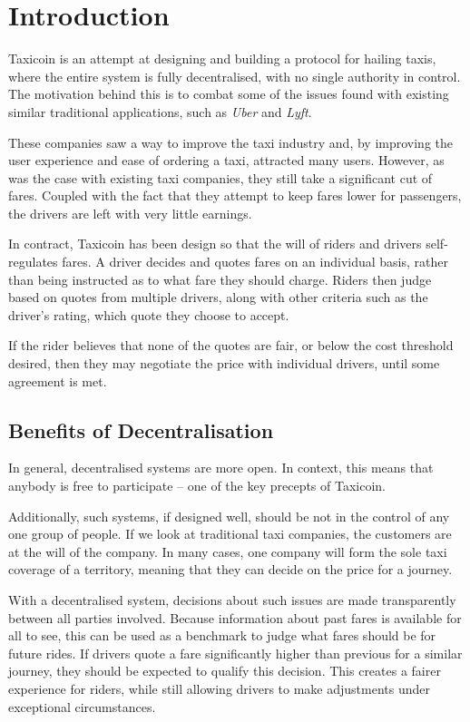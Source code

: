 \section{Introduction}

Taxicoin is an attempt at designing and building a protocol for hailing taxis, where the entire system is fully decentralised, with no single authority in control. The motivation behind this is to combat some of the issues found with existing similar traditional applications, such as \textit{Uber} and \textit{Lyft}.

These companies saw a way to improve the taxi industry and, by improving the user experience and ease of ordering a taxi, attracted many users. However, as was the case with existing taxi companies, they still take a significant cut of fares. Coupled with the fact that they attempt to keep fares lower for passengers, the drivers are left with very little earnings.

In contract, Taxicoin has been design so that the will of riders and drivers self-regulates fares. A driver decides and quotes fares on an individual basis, rather than being instructed as to what fare they should charge. Riders then judge based on quotes from multiple drivers, along with other criteria such as the driver's rating, which quote they choose to accept.

If the rider believes that none of the quotes are fair, or below the cost threshold desired, then they may negotiate the price with individual drivers, until some agreement is met.

\subsection{Benefits of Decentralisation}

In general, decentralised systems are more open. In context, this means that anybody is free to participate -- one of the key precepts of Taxicoin.

Additionally, such systems, if designed well, should be not in the control of any one group of people. If we look at traditional taxi companies, the customers are at the will of the company. In many cases, one company will form the sole taxi coverage of a territory, meaning that they can decide on the price for a journey.

With a decentralised system, decisions about such issues are made transparently between all parties involved. Because information about past fares is available for all to see, this can be used as a benchmark to judge what fares should be for future rides. If drivers quote a fare significantly higher than previous for a similar journey, they should be expected to qualify this decision. This creates a fairer experience for riders, while still allowing drivers to make adjustments under exceptional circumstances.


